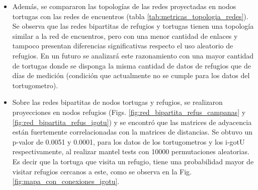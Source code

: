 \begin{itemize}
\item Además, se compararon las topologías de las redes proyectadas en nodos tortugas con las redes de encuentros (tabla \ref{tab:metricas_topologia_redes}). Se observa que las redes bipartitas de refugios y tortugas tienen una topología similar a la red de encuentros, pero con una menor cantidad de enlaces y tampoco presentan diferencias significativas respecto el uso aleatorio de refugios.  En un futuro se analizará este razonamiento con una mayor cantidad de tortugas donde se disponga la misma cantidad de datos de refugios que de días de medición (condición que actualmente no se cumple para los datos del tortugometro).
 
\item Sobre las redes bipartitas de nodos tortugas y refugios, se realizaron proyecciones en nodos refugios (Figs. \ref{fig:red_bipartita_refus_campanas} y \ref{fig:red_bipartita_refus_igotu}) y se encontró que las matrices de adyacencia están fuertemente correlacionadas con la matrices de distancias. Se obtuvo un p-valor de 0.0051 y 0.0001, para los datos de los tortugometros y los i-gotU respectivamente, al realizar mantel tests con 10000 permutaciones aleatorias. Es decir que la tortuga que visita un refugio, tiene una probabilidad mayor de visitar refugios cercanos a este, como se observa en la Fig. \ref{fig:mapa_con_conexiones_igotu}.
 
\end{itemize}
 
 
 
 
 
 
 
 
 
 
 
 

